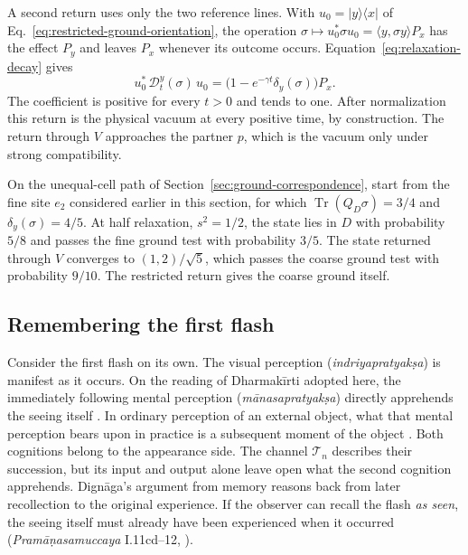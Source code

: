 \documentclass[11pt]{article}
\theoremstyle{definition}
\DeclareMathOperator{\Tr}{Tr}
\newcommand{\ket}[1]{\lvert #1\rangle}
\newcommand{\bra}[1]{\langle #1\rvert}
\begin{document}
A second return uses only the two reference lines. With $u_0=\ket{y}\!\bra{x}$ of Eq.~\eqref{eq:restricted-ground-orientation}, the operation $\sigma\mapsto u_0^*\sigma u_0=\langle y,\sigma y\rangle P_x$ has the effect $P_y$ and leaves $P_x$ whenever its outcome occurs. Equation~\eqref{eq:relaxation-decay} gives
\begin{equation}
 u_0^*\,\mathcal D_t^y(\sigma)\,u_0=\bigl(1-e^{-\gamma t}\delta_y(\sigma)\bigr)P_x .
 \label{eq:relaxation-restricted-return}
\end{equation}
The coefficient is positive for every $t>0$ and tends to one. After normalization this return is the physical vacuum at every positive time, by construction. The return through $V$ approaches the partner $p$, which is the vacuum only under strong compatibility.

On the unequal-cell path of Section~\ref{sec:ground-correspondence}, start from the fine site $e_2$ considered earlier in this section, for which $\Tr(Q_D\sigma)=3/4$ and $\delta_y(\sigma)=4/5$. At half relaxation, $s^2=1/2$, the state lies in $D$ with probability $5/8$ and passes the fine ground test with probability $3/5$. The state returned through $V$ converges to $(1,2)/\sqrt5$, which passes the coarse ground test with probability $9/10$. The restricted return gives the coarse ground itself.

\subsection{Remembering the first flash}
Consider the first flash on its own. The visual perception (\emph{indriyapratyak\d{s}a}) is manifest as it occurs. On the reading of Dharmak\=irti adopted here, the immediately following mental perception (\emph{m\=anasapratyak\d{s}a}) directly apprehends the seeing itself \cite[p.~102 n.~47 and Fig.~1 on p.~104]{Yiannopoulos2020}. In ordinary perception of an external object, what that mental perception bears upon in practice is a subsequent moment of the object \cite[pp.~96--97 n.~38 and p.~524 n.~29]{Yiannopoulos2020}. Both cognitions belong to the appearance side. The channel $\mathcal T_n$ describes their succession, but its input and output alone leave open what the second cognition apprehends. Dign\=aga's argument from memory reasons back from later recollection to the original experience. If the observer can recall the flash \emph{as seen}, the seeing itself must already have been experienced when it occurred (\emph{Pram\=a\d{n}asamuccaya} I.11cd--12, \cite[pp.~18--19]{Yiannopoulos2020}).
\end{document}
